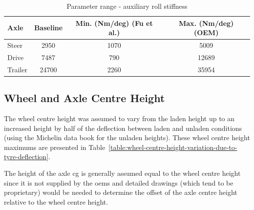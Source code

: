 \begin{table}[H]
	\centering\footnotesize
	\begin{threeparttable}

		\begin{tabulary}{\textwidth}{lccc}
			\toprule
			\textbf{Axle} & \textbf{Baseline} & \textbf{Min. (Nm/deg) (Fu et al.)} & \textbf{Max. (Nm/deg) (OEM)} \\
			\midrule
			Steer & 2950  & 1070  & 5009 \\
			Drive & 7487 & 790 & 12689 \\
			Trailer & 24700 & 2260  & 35954 \\
			\bottomrule
		\end{tabulary}

		\caption{Parameter range - auxiliary roll stiffness}
		\label{table:parameter-range-auxiliary-roll-stiffness}


	\end{threeparttable}
\end{table}

\subsection{Wheel and Axle Centre Height}\label{section:axle-centre-height}

The wheel centre height was assumed to vary from the laden height up to an increased height by half of the deflection between laden and unladen conditions (using the Michelin data book \cite{Michelin} for the unladen heights). These wheel centre height maximums are presented in Table~\ref{table:wheel-centre-height-variation-due-to-tyre-deflection}.

The height of the axle \gls{cg} is generally assumed equal to the wheel centre height since it is not supplied by the \glspl{oem} and detailed drawings (which tend to be proprietary) would be needed to determine the offset of the axle centre height relative to the wheel centre height.

